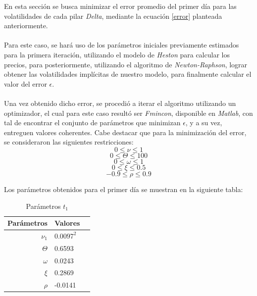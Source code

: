 \noindent En esta sección se busca minimizar el error promedio del primer día para las volatilidades de cada pilar \textit{Delta}, mediante la ecuación \ref{error} planteada anteriormente.\\\\
\noindent Para este caso, se hará uso de los parámetros iniciales previamente estimados para la primera iteración, utilizando el modelo de \textit{Heston} para calcular los precios, para posteriormente, utilizando el algoritmo de \textit{Newton-Raphson}, lograr obtener las volatilidades implícitas de nuestro modelo, para finalmente calcular el valor del error $\epsilon$.\\\\
\noindent Una vez obtenido dicho error, se procedió a iterar el algoritmo utilizando un optimizador, el cual para este caso resultó ser \textit{Fmincon}, disponible en \textit{Matlab}, con tal de encontrar el conjunto de parámetros que minimizan $\epsilon$, y a su vez, entreguen valores coherentes. Cabe destacar que para la minimización del error, se consideraron  las siguientes restricciones:
\begin{equation*}
	0\le \nu	\le1
\end{equation*}
\begin{equation*}
0	\le \Theta	\le100
\end{equation*}
\begin{equation*}
	0\le \omega	\le1
\end{equation*}
\begin{equation*}
0	\le \xi	\le0.5
\end{equation*}
\begin{equation*}
-0.9	\le \rho	\le0.9
\end{equation*}

\noindent Los parámetros obtenidos para el primer día se muestran en la siguiente tabla:

\begin{table}[h]
\begin{center}
\begin{tabular}{| r | l | c |}
\hline 
Parámetros & Valores  \\ \hline
$\nu_1$ & $0.0097^2$  \\
$\Theta$ & 0.6593  \\
$\omega$ & 0.0243    \\
$\xi$ & 0.2869  \\
$\rho$ & -0.0141 \\ \hline
\end{tabular}
\caption{Parámetros $t_1$}
\label{tab:parametros1}
\end{center}
\end{table}

